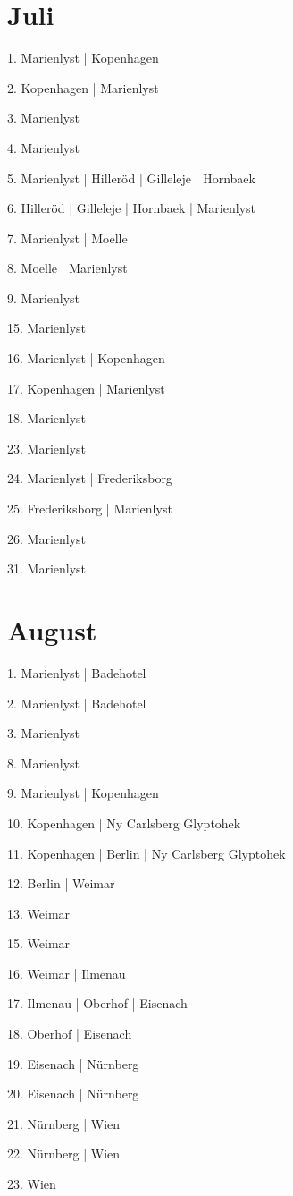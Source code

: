 \documentclass[twoside=false,titlepage=false,open=any, parskip=never, fontsize=10pt, headings=small, chapterprefix=false, appendixprefix=false, DIV=15]{scrbook}
\begin{document}
\begin{multicols}{3}
            \section*{Juli}
            1. Marienlyst | Kopenhagen\par
            2. Kopenhagen | Marienlyst\par
            3. Marienlyst\par
            4. Marienlyst\par
            5. Marienlyst | Hilleröd | Gilleleje | Hornbaek\par
            6. Hilleröd | Gilleleje | Hornbaek | Marienlyst\par
            7. Marienlyst | Moelle\par
            8. Moelle | Marienlyst\par
            9. Marienlyst\par
            15. Marienlyst\par
            16. Marienlyst | Kopenhagen\par
            17. Kopenhagen | Marienlyst\par
            18. Marienlyst\par
            23. Marienlyst\par
            24. Marienlyst | Frederiksborg\par
            25. Frederiksborg | Marienlyst\par
            26. Marienlyst\par
            31. Marienlyst\par
            \section*{August}
            1. Marienlyst | Badehotel\par
            2. Marienlyst | Badehotel\par
            3. Marienlyst\par
            8. Marienlyst\par
            9. Marienlyst | Kopenhagen\par
            10. Kopenhagen | Ny Carlsberg Glyptohek\par
            11. Kopenhagen | Berlin | Ny Carlsberg Glyptohek\par
            12. Berlin | Weimar\par
            13. Weimar\par
            15. Weimar\par
            16. Weimar | Ilmenau\par
            17. Ilmenau | Oberhof | Eisenach\par
            18. Oberhof | Eisenach\par
            19. Eisenach | Nürnberg\par
            20. Eisenach | Nürnberg\par
            21. Nürnberg | Wien\par
            22. Nürnberg | Wien\par
            23. Wien\par

\end{multicols}
\end{document}
